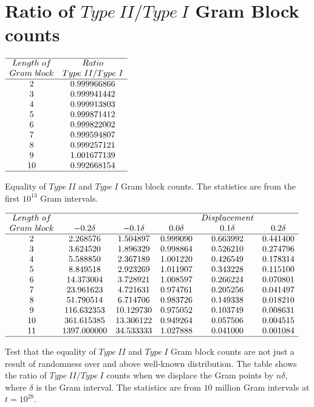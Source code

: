\documentclass[twoside]{article}
\theoremstyle{definition}
\begin{document}
\section{\label{sec6}Ratio of $Type~II/Type~I$ Gram Block counts}

\begin{table}
\centering \(\begin{array}{cc}
\hline
Length~of 	& Ratio  \\
Gram~block	& Type~II/Type~I \\
\hline
2& 0.999966866\\
3& 0.999941442\\
4& 0.999913803\\
5& 0.999871412\\
6& 0.999822002\\
7& 0.999594807\\
8& 0.999257121\\
9& 1.001677139\\
10& 0.992668154\\
\hline
\end{array}\)
\caption{Equality of $Type~II$ and $Type~I$ Gram block counts. The statistics are from the first $10^{13}$ Gram intervals.} \label{tab:rosser}
\end{table}

\begin{table}
\centering \(\begin{array}{cccccc}
\hline
Length~of 	& &&&Displacement \\
Gram~block	& -0.2\delta & -0.1\delta & 0.0\delta & 0.1\delta & 0.2\delta  \\
\hline
2 &2.268576&1.504897&0.999090&0.663992&0.441400 \\
3 &3.624520&1.896329&0.998864&0.526210&0.274796 \\
4 &5.588850&2.367189&1.001220&0.426549&0.178314 \\
5 &8.849518&2.923269&1.011907&0.343228&0.115100 \\
6 &14.373004&3.728921&1.008597&0.266224&0.070801 \\
7 &23.961623&4.721631&0.974761&0.205256&0.041497 \\
8 &51.790514&6.714706&0.983726&0.149338&0.018210 \\
9 &116.632353&10.129730&0.975052&0.103749&0.008631 \\
10 &361.615385&13.306122&0.949264&0.057506&0.004515 \\
11 &1397.000000&34.533333&1.027888&0.041000&0.001084 \\
\hline
\end{array}\)
\caption{Test that the equality of $Type~II$ and $Type~I$ Gram block counts are not just a result of randomness over and above well-known distribution. The table shows the ratio of $Type~II/Type~I$ counts when we displace the Gram points by $n\delta$, where $\delta$ is the Gram interval. The statistics are from $10$ million Gram intervals at $t=10^{28}$.} \label{tab:rosserrandom}
\end{table}
\end{document}
